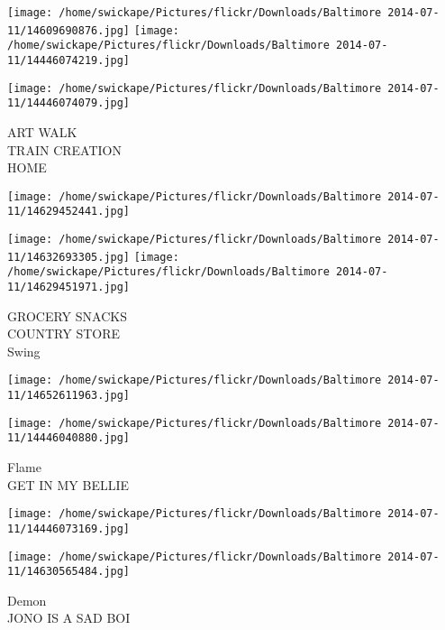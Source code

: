 \documentclass[10pt,letterpaper]{article}
\begin{document}
\texttt{[image: /home/swickape/Pictures/flickr/Downloads/Baltimore 2014-07-11/14609690876.jpg]}
\texttt{[image: /home/swickape/Pictures/flickr/Downloads/Baltimore 2014-07-11/14446074219.jpg]}

\vspace{0.25in}
\texttt{[image: /home/swickape/Pictures/flickr/Downloads/Baltimore 2014-07-11/14446074079.jpg]}

ART WALK\\
TRAIN CREATION\\
HOME\\
\pagebreak

\texttt{[image: /home/swickape/Pictures/flickr/Downloads/Baltimore 2014-07-11/14629452441.jpg]}

\vspace{0.25in}
\texttt{[image: /home/swickape/Pictures/flickr/Downloads/Baltimore 2014-07-11/14632693305.jpg]}
\texttt{[image: /home/swickape/Pictures/flickr/Downloads/Baltimore 2014-07-11/14629451971.jpg]}

GROCERY SNACKS\\
COUNTRY STORE\\
Swing\\
\pagebreak

\texttt{[image: /home/swickape/Pictures/flickr/Downloads/Baltimore 2014-07-11/14652611963.jpg]}

\vspace{0.25in}
\texttt{[image: /home/swickape/Pictures/flickr/Downloads/Baltimore 2014-07-11/14446040880.jpg]}

Flame\\
GET IN MY BELLIE\\
\pagebreak

\texttt{[image: /home/swickape/Pictures/flickr/Downloads/Baltimore 2014-07-11/14446073169.jpg]}

\vspace{0.25in}
\texttt{[image: /home/swickape/Pictures/flickr/Downloads/Baltimore 2014-07-11/14630565484.jpg]}

Demon\\
JONO IS A SAD BOI\\
\pagebreak
\end{document}
